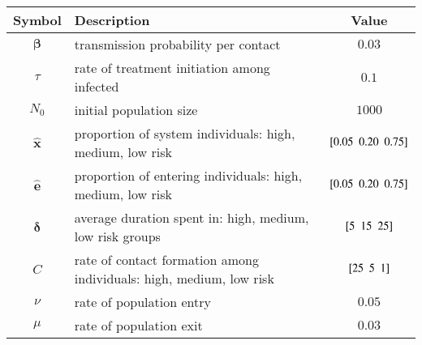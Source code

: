 \begin{tabular}{clc}
	\toprule
	    Symbol     & Description                                                         &            Value             \\
	\midrule
	 $\bm{\beta}$  & transmission probability per contact                                &            $0.03$            \\
	    $\tau$     & rate of treatment initiation among infected                         &            $0.1$             \\
	    $N_0$      & initial population size                                             &            $1000$            \\
	\midrule
	$\bm{\hat{x}}$ & proportion of system individuals: high, medium, low risk            & $[ 0.05 \enspace 0.20 \enspace 0.75 ]$ \\
	$\bm{\hat{e}}$ & proportion of entering individuals: high, medium, low risk          & $[ 0.05 \enspace 0.20 \enspace 0.75 ]$ \\
	$\bm{\delta}$  & average duration spent in: high, medium, low risk groups            &    $[ 5 \enspace 15 \enspace 25 ]$     \\
	     $C$       & rate of contact formation among individuals: high, medium, low risk &     $[ 25 \enspace 5 \enspace 1 ]$     \\
	    $\nu$      & rate of population entry                                            &            $0.05$            \\
	    $\mu$      & rate of population exit                                             &            $0.03$            \\
	\bottomrule
\end{tabular}
